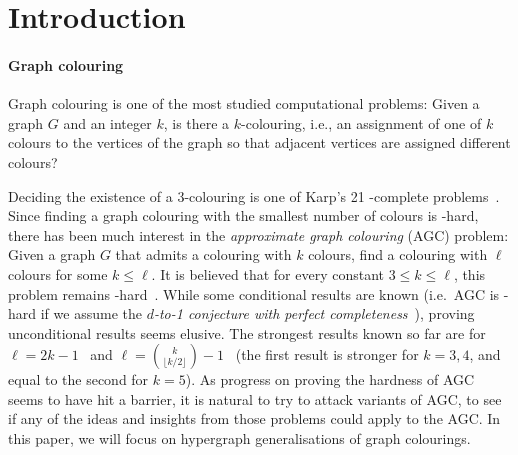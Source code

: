 \documentclass[a4paper,11pt]{article}
\newcommand{\2}{\vec{2}}
\newcommand{\1}{\vec{1}}
\newcommand{\0}{\vec{0}}
\theoremstyle{plain}
\theoremstyle{definition}
\begin{document}
\section{Introduction}\label{sec:intro}

\paragraph{Graph colouring}
Graph colouring is one of the most studied computational problems: Given a graph $G$ and an integer $k$, is there a $k$-colouring, i.e., an assignment of one of $k$ colours to the vertices of the graph so that adjacent vertices are assigned different colours? 

Deciding the existence of a 3-colouring is one of Karp's 21 \NP-complete problems~\cite{Karp1972}. Since finding a graph colouring with the smallest number of colours is \NP-hard, there has been much interest in the \emph{approximate graph colouring} (AGC) problem: Given a graph $G$ that admits a colouring with $k$ colours, find a colouring with $\ell$ colours for some $k\leq\ell$.
It is believed that for every constant $3 \leq k \leq \ell$, this problem remains \NP-hard~\cite{GJ76}. While some conditional results are known (i.e.~AGC is \NP-hard if we assume the \emph{$d$-to-1 conjecture with perfect completeness}~\cite{GS20:icalp}), proving unconditional results seems elusive. The strongest results known so far are for $\ell = 2k - 1$~\cite{BBKO21} and $\ell = \binom{k}{\lfloor k / 2 \rfloor} - 1$~\cite{KOWZ23} (the first result is stronger for $k = 3, 4$, and equal to the second for $k = 5$). As progress on proving the hardness of AGC seems to have hit a barrier, it is natural to try to attack variants of AGC, to see if any of the ideas and insights from those problems could apply to the AGC. In this paper,  we will focus on hypergraph generalisations of graph colourings.
\end{document}
